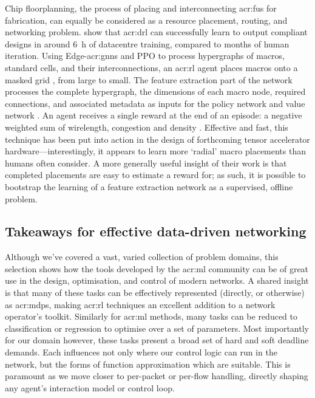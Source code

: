 Chip floorplanning, the process of placing and interconnecting \glspl{acr:fu} for fabrication, can equally be considered as a resource placement, routing, and networking problem.
\Textcite{Mirhoseini2021} show that \gls{acr:drl} can successfully learn to output compliant designs in around \qty{6}{\hour} of datacentre training, compared to months of human iteration.
Using Edge-\glspl{acr:gnn} and PPO to process hypergraphs of macros, standard cells, and their interconnections, an \gls{acr:rl} agent places macros onto a masked  grid \prllitact, from large to small.
The feature extraction part of the network processes the complete hypergraph, the dimensions of  each macro node, required connections, and associated metadata as inputs for the policy network and value network \prllitstate.
An agent receives a single reward at the end of an episode: a negative weighted sum of wirelength, congestion and density \prllitreward.
Effective and fast, this technique has been put into action in the design of forthcoming tensor accelerator hardware---interestingly, it appears to learn more `radial' macro placements than humans often consider.
A more generally useful insight of their work is that completed placements are easy to estimate a reward for; as such, it is possible to bootstrap the learning of a feature extraction network as a supervised, offline problem.

\subsection{Takeaways for effective data-driven networking}\label{sec:ddn-use-takeaways}
Although we've covered a vast, varied collection of problem domains, this selection shows how the tools developed by the \gls{acr:ml} community can be of great use in the design, optimisation, and control of modern networks.
A shared insight is that many of these tasks can be effectively represented (directly, or otherwise) as \glspl{acr:mdp}, making \gls{acr:rl} techniques an excellent addition to a network operator's toolkit.
Similarly for \gls{acr:ml} methods, many tasks can be reduced to classification or regression to optimise over a set of parameters.
Most importantly for our domain however, these tasks present a broad set of hard and soft deadline demands. 
Each influences not only where our control logic can run in the network, but the forms of function approximation which are suitable.
This is paramount as we move closer to per-packet or per-flow handling, directly shaping any agent's interaction model or control loop.

